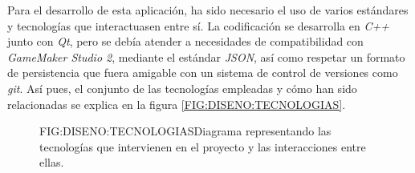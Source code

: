 Para el desarrollo de esta aplicación, ha sido necesario el uso de varios estándares y tecnologías que interactuasen entre sí. La codificación se desarrolla en \textit{C++} junto con \textit{Qt}, pero se debía atender a necesidades de compatibilidad con \textit{GameMaker Studio 2}, mediante el estándar \textit{JSON}, así como respetar un formato de persistencia que fuera amigable con un sistema de control de versiones como \textit{git}.
Así pues, el conjunto de las tecnologías empleadas y cómo han sido relacionadas se explica en la figura \ref{FIG:DISENO:TECNOLOGIAS}.

\begin{figure}{FIG:DISENO:TECNOLOGIAS}{Diagrama representando las tecnologías que intervienen en el proyecto y las interacciones entre ellas.}
\end{figure}
